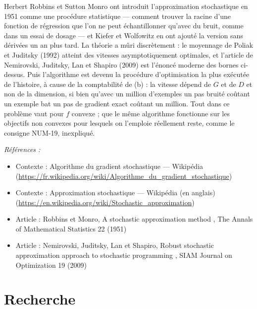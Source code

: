 \documentclass[11pt]{article}
\newenvironment{refs}{\par\small\noindent\emph{Références :}\begin{itemize}\setlength\itemsep{0pt}}{\end{itemize}\normalsize}
\begin{document}
\noindent Herbert Robbins et Sutton Monro ont introduit l'approximation stochastique en 1951 comme une procédure statistique --- comment trouver la racine d'une fonction de régression que l'on ne peut échantillonner qu'avec du bruit, comme dans un essai de dosage --- et Kiefer et Wolfowitz en ont ajouté la version sans dérivées un an plus tard. La théorie a mûri discrètement : le moyennage de Poliak et Juditsky (1992) atteint des vitesses asymptotiquement optimales, et l'article de Nemirovski, Juditsky, Lan et Shapiro (2009) est l'énoncé moderne des bornes ci-dessus. Puis l'algorithme est devenu la procédure d'optimisation la plus exécutée de l'histoire, à cause de la comptabilité de (b) : la vitesse dépend de $G$ et de $D$ et non de la dimension, si bien qu'avec un million d'exemples un pas bruité coûtant un exemple bat un pas de gradient exact coûtant un million. Tout dans ce problème vaut pour $f$ convexe ; que le même algorithme fonctionne sur les objectifs non convexes pour lesquels on l'emploie réellement reste, comme le consigne NUM-19, inexpliqué.

\begin{refs}
\item Contexte : Algorithme du gradient stochastique --- Wikipédia (\url{https://fr.wikipedia.org/wiki/Algorithme_du_gradient_stochastique})
\item Contexte : Approximation stochastique --- Wikipédia (en anglais) (\url{https://en.wikipedia.org/wiki/Stochastic_approximation})
\item Article : Robbins et Monro, \og{} A stochastic approximation method \fg{}, The Annals of Mathematical Statistics 22 (1951)
\item Article : Nemirovski, Juditsky, Lan et Shapiro, \og{} Robust stochastic approximation approach to stochastic programming \fg{}, SIAM Journal on Optimization 19 (2009)
\end{refs}

\bigskip


\section*{Recherche}
\end{document}
